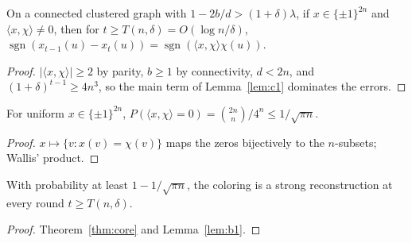 \begin{theorem}\label{thm:core}
\leanok{}
On a connected clustered graph with $1-2b/d>(1+\delta)\lambda$, if $x\in\{\pm1\}^{2n}$ and
$\langle x,\chi\rangle\ne0$, then for $t\ge T(n,\delta)=O(\log n/\delta)$,
$\operatorname{sgn}(x_{t-1}(u)-x_t(u))=\operatorname{sgn}(\langle x,\chi\rangle\chi(u))$.
\end{theorem}
\begin{proof}\leanok
$|\langle x,\chi\rangle|\ge2$ by parity, $b\ge1$ by connectivity, $d<2n$, and
$(1+\delta)^{t-1}\ge4n^3$, so the main term of Lemma~\ref{lem:c1} dominates the errors.
\end{proof}
\begin{lemma}\label{lem:b1}
\leanok{}
For uniform $x\in\{\pm1\}^{2n}$, $P(\langle x,\chi\rangle=0)=\binom{2n}{n}/4^n\le1/\sqrt{\pi n}$.
\end{lemma}
\begin{proof}\leanok
$x\mapsto\{v: x(v)=\chi(v)\}$ maps the zeros bijectively to the $n$-subsets; Wallis' product.
\end{proof}
\begin{theorem}\label{thm:strong}
\leanok{}
With probability at least $1-1/\sqrt{\pi n}$, the coloring is a strong reconstruction at every
round $t\ge T(n,\delta)$.
\end{theorem}
\begin{proof}\leanok
Theorem~\ref{thm:core} and Lemma~\ref{lem:b1}.
\end{proof}

